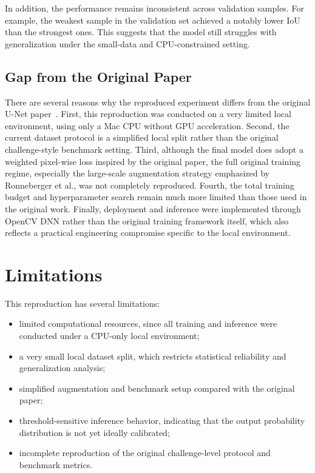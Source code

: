 \documentclass[11pt]{article}
\begin{document}
In addition, the performance remains inconsistent across validation samples. For example, the weakest sample in the validation set achieved a notably lower IoU than the strongest ones. This suggests that the model still struggles with generalization under the small-data and CPU-constrained setting.

\subsection{Gap from the Original Paper}

There are several reasons why the reproduced experiment differs from the original U-Net paper~\cite{ronneberger2015u}. First, this reproduction was conducted on a very limited local environment, using only a Mac CPU without GPU acceleration. Second, the current dataset protocol is a simplified local split rather than the original challenge-style benchmark setting. Third, although the final model does adopt a weighted pixel-wise loss inspired by the original paper, the full original training regime, especially the large-scale augmentation strategy emphasized by Ronneberger et al., was not completely reproduced. Fourth, the total training budget and hyperparameter search remain much more limited than those used in the original work. Finally, deployment and inference were implemented through OpenCV DNN rather than the original training framework itself, which also reflects a practical engineering compromise specific to the local environment.

\section{Limitations}

This reproduction has several limitations:

\begin{itemize}[leftmargin=1.5em]
    \item limited computational resources, since all training and inference were conducted under a CPU-only local environment;
    \item a very small local dataset split, which restricts statistical reliability and generalization analysis;
    \item simplified augmentation and benchmark setup compared with the original paper;
    \item threshold-sensitive inference behavior, indicating that the output probability distribution is not yet ideally calibrated;
    \item incomplete reproduction of the original challenge-level protocol and benchmark metrics.
\end{itemize}
\end{document}

